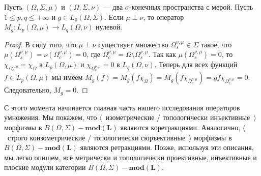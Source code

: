 \begin{proposition}\label{MultOpCharacBtwnTwoSingMeasSp} Пусть $(\Omega,\Sigma,\mu)$ и $(\Omega,\Sigma,\nu)$ --- два $\sigma$-конечных пространства с мерой. Пусть $1\leq p,q\leq +\infty$ и $g\in L_0(\Omega,\Sigma)$. Если $\mu\perp\nu$, то оператор $M_g:L_p(\Omega,\mu)\to L_q(\Omega,\nu)$ нулевой.
\end{proposition}
\begin{proof} В силу того, что $\mu\perp\nu$ существует множество $\Omega_s^{\nu,\mu}\in\Sigma$ такое, что $\mu(\Omega_s^{\nu,\mu})=\nu(\Omega_c^{\nu,\mu})=0$, где $\Omega_c^{\nu,\mu}=\Omega\setminus\Omega_s^{\nu,\mu}$. Так как $\mu(\Omega_s^{\nu,\mu})=0$, то $\chi_{\Omega_c^{\nu,\mu}}=\chi_{\Omega}$ в $L_p(\Omega,\mu)$ и $\chi_{\Omega_c^{\nu,\mu}}=0$ в $L_q(\Omega,\nu)$. Теперь для всех функций $f\in L_p(\Omega,\mu)$ мы имеем $M_g(f)=M_g(f \chi_{\Omega})=M_g(f \chi_{\Omega_c^{\nu,\mu}})=g f\chi_{\Omega_c^{\nu,\mu}}=0$. Следовательно, $M_g=0$.
\end{proof}

С этого момента начинается главная часть нашего исследования операторов умножения. Мы покажем, что $\langle$~изометрические / топологически инъективные~$\rangle$ морфизмы в $B(\Omega,\Sigma)-\mathbf{mod(L)}$ являются коретракциями. Аналогично, $\langle$~строго коизометрические / топологически сюръективные~$\rangle$ морфизмы в $B(\Omega,\Sigma)-\mathbf{mod(L)}$ являются ретракциями. Позже, используя эти описания, мы легко опишем, все метрически и топологически проективные, инъективные и плоские модули категории $B(\Omega,\Sigma)-\mathbf{mod(L)}$.

